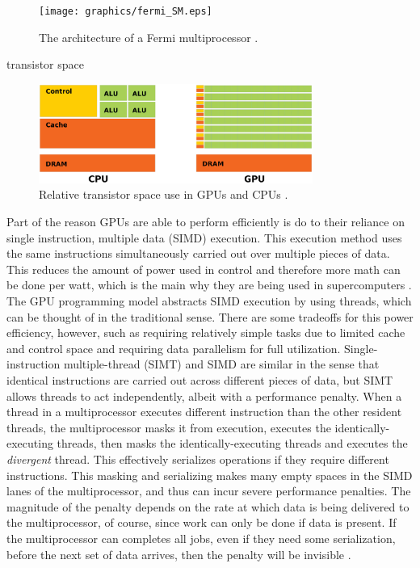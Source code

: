 \begin{figure}[h!] 
  \centering
    \texttt{[image: graphics/fermi\_SM.eps]}
     \caption{The architecture of a Fermi multiprocessor \cite{cuda}. \label{fermi_SM}}
\end{figure}

transistor space

\begin{figure}[h!] 
  \centering
    \includegraphics[width=0.8\textwidth]{graphics/CUDA_transistors.eps}
     \caption{Relative transistor space use in GPUs and CPUs \cite{cuda}. \label{cuda_transistors}}
\end{figure}

Part of the reason GPUs are able to perform efficiently is do to their reliance on single instruction, multiple data (SIMD) execution.  This execution method uses the same instructions simultaneously carried out over multiple pieces of data.  This reduces the amount of power used in control and therefore more math can be done per watt, which is the main why they are being used in supercomputers \cite{citation_definitely_needed}.  The GPU programming model abstracts SIMD execution by using threads, which can be thought of in the traditional sense. There are some tradeoffs for this power efficiency, however, such as requiring relatively simple tasks due to limited cache and control space and requiring data parallelism for full utilization.  Single-instruction multiple-thread (SIMT) and SIMD are similar in the sense that identical instructions are carried out across different pieces of data, but SIMT allows threads to act independently, albeit with a performance penalty.   When a thread in a multiprocessor executes different instruction than the other resident threads, the multiprocessor masks it from execution, executes the identically-executing threads, then masks the identically-executing threads and executes the \emph{divergent} thread.  This effectively serializes operations if they require different instructions.  This masking and serializing makes many empty spaces in the SIMD lanes of the multiprocessor, and thus can incur severe performance penalties.  The magnitude of the penalty depends on the rate at which data is being delivered to the multiprocessor, of course, since work can only be done if data is present.  If the multiprocessor can completes all jobs, even if they need some serialization, before the next set of data arrives, then the penalty will be invisible \cite{cuda}.

